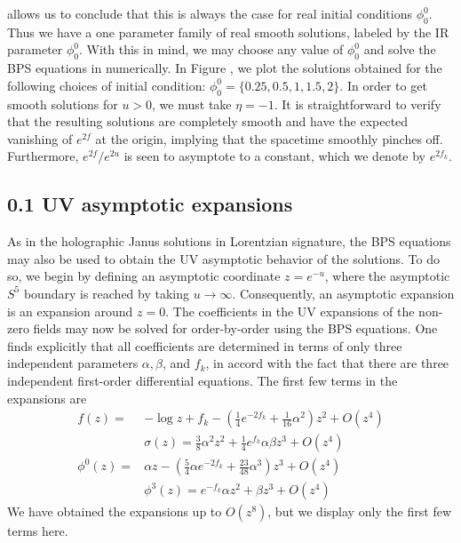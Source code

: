 \documentclass{article}
\begin{document}
allows us to conclude that this is always the case for real initial conditions \(\phi_{0}^{0}\). Thus we have a one parameter family of real smooth solutions, labeled by the IR parameter \(\phi_{0}^{0}\). With this in mind, we may choose any value of \(\phi_{0}^{0}\) and solve the BPS equations in numerically. In Figure , we plot the solutions obtained for the following choices of initial condition: \(\phi_{0}^{0}=\{0.25,0.5,1,1.5,2\}\). In order to get smooth solutions for \(u>0\), we must take \(\eta=-1\). It is straightforward to verify that the resulting solutions are completely smooth and have the expected vanishing of \(e^{2 f}\) at the origin, implying that the spacetime smoothly pinches off. Furthermore, \(e^{2 f} / e^{2 u}\) is seen to asymptote to a constant, which we denote by \(e^{2 f_{k}}\).
\subsection*{0.1 UV asymptotic expansions}
As in the holographic Janus solutions in Lorentzian signature, the BPS equations may also be used to obtain the UV asymptotic behavior of the solutions. To do so, we begin by defining an asymptotic coordinate \(z=e^{-u}\), where the asymptotic \(S^{5}\) boundary is reached by taking \(u \rightarrow \infty\). Consequently, an asymptotic expansion is an expansion around \(z=0\). The coefficients in the UV expansions of the non-zero fields may now be solved for order-by-order using the BPS equations. One finds explicitly that all coefficients are determined in terms of only three independent parameters \(\alpha, \beta\), and \(f_{k}\), in accord with the fact that there are three independent first-order differential equations. The first few terms in the expansions are
\[
\begin{aligned}
f(z)= & -\log z+f_{k}-\left(\frac{1}{4} e^{-2 f_{k}}+\frac{1}{16} \alpha^{2}\right) z^{2}+O\left(z^{4}\right) \\
& \sigma(z)=\frac{3}{8} \alpha^{2} z^{2}+\frac{1}{4} e^{f_{k}} \alpha \beta z^{3}+O\left(z^{4}\right) \\
\phi^{0}(z)= & \alpha z-\left(\frac{5}{4} \alpha e^{-2 f_{k}}+\frac{23}{48} \alpha^{3}\right) z^{3}+O\left(z^{4}\right) \\
& \phi^{3}(z)=e^{-f_{k}} \alpha z^{2}+\beta z^{3}+O\left(z^{4}\right)
\end{aligned}
\]
We have obtained the expansions up to \(O\left(z^{8}\right)\), but we display only the first few terms here.
\end{document}

